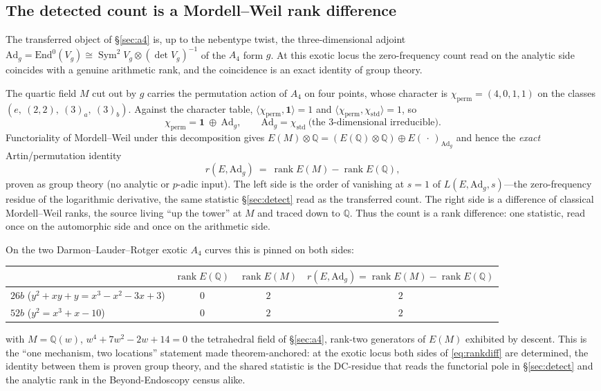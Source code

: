 \documentclass[11pt]{article}
\theoremstyle{definition}
\newcommand{\Sym}{\operatorname{Sym}}
\begin{document}
\subsection{The detected count is a Mordell--Weil rank difference}\label{sec:rankdiff}

The transferred object of \S\ref{sec:a4} is, up to the nebentype twist, the three-dimensional
adjoint $\mathrm{Ad}_g=\mathrm{End}^0(V_g)\cong\Sym^2 V_g\otimes(\det V_g)^{-1}$ of the $A_4$ form
$g$. At this exotic locus the zero-frequency count read on the analytic side coincides with a
genuine arithmetic rank, and the coincidence is an exact identity of group theory.

The quartic field $M$ cut out by $g$ carries the permutation action of $A_4$ on four points, whose
character is $\chi_{\mathrm{perm}}=(4,0,1,1)$ on the classes $(e,\ (2,2),\ (3)_a,\ (3)_b)$. Against the
character table, $\langle\chi_{\mathrm{perm}},\mathbf 1\rangle=1$ and
$\langle\chi_{\mathrm{perm}},\chi_{\mathrm{std}}\rangle=1$, so
\[
  \chi_{\mathrm{perm}}=\mathbf 1\ \oplus\ \mathrm{Ad}_g,\qquad \mathrm{Ad}_g=\chi_{\mathrm{std}}\
  \text{(the $3$-dimensional irreducible)} .
\]
Functoriality of Mordell--Weil under this decomposition gives
$E(M)\otimes\mathbb Q = (E(\mathbb Q)\otimes\mathbb Q)\oplus E(\,\cdot\,)_{\mathrm{Ad}_g}$ and hence the
\emph{exact} Artin/permutation identity
\begin{equation}\label{eq:rankdiff}
  r(E,\mathrm{Ad}_g)\ =\ \operatorname{rank}E(M)-\operatorname{rank}E(\mathbb Q),
\end{equation}
proven as group theory (no analytic or $p$-adic input). The left side is the order of vanishing at
$s=1$ of $L(E,\mathrm{Ad}_g,s)$---the zero-frequency residue of the logarithmic derivative, the same
statistic \S\ref{sec:detect} read as the transferred count. The right side is a difference of
classical Mordell--Weil ranks, the source living ``up the tower'' at $M$ and traced down to
$\mathbb Q$. Thus the count is a rank difference: one statistic, read once on the automorphic side
and once on the arithmetic side.

On the two Darmon--Lauder--Rotger exotic $A_4$ curves this is pinned on both sides:
\begin{center}
\begin{tabular}{lccc}
\toprule
 & $\operatorname{rank}E(\mathbb Q)$ & $\operatorname{rank}E(M)$ & $r(E,\mathrm{Ad}_g)=\operatorname{rank}E(M)-\operatorname{rank}E(\mathbb Q)$ \\
\midrule
$26b$ ($y^2+xy+y=x^3-x^2-3x+3$) & $0$ & $2$ & $2$ \\
$52b$ ($y^2=x^3+x-10$) & $0$ & $2$ & $2$ \\
\bottomrule
\end{tabular}
\end{center}
with $M=\mathbb Q(w)$, $w^4+7w^2-2w+14=0$ the tetrahedral field of \S\ref{sec:a4}, rank-two
generators of $E(M)$ exhibited by descent. This is the ``one mechanism, two locations'' statement
made theorem-anchored: at the exotic locus both sides of \eqref{eq:rankdiff} are determined, the
identity between them is proven group theory, and the shared statistic is the DC-residue that reads
the functorial pole in \S\ref{sec:detect} and the analytic rank in the Beyond-Endoscopy census
alike.
\end{document}
